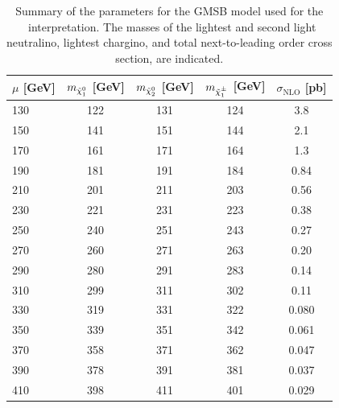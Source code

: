 \begin{table}[htb]
\begin{center}
\footnotesize
\caption{\label{tab:gmsb} Summary of the parameters for the GMSB model used for the \zzmet\ interpretation.
The masses of the lightest and second light neutralino, lightest chargino, and total next-to-leading order
cross section, are indicated.}
\begin{tabular}{l|cccc}
\hline
\hline
$\mu$ [GeV] & $m_{\tilde{\chi}^{0}_{1}}$ [GeV] & $m_{\tilde{\chi}^{0}_{2}}$ [GeV] & $m_{\tilde{\chi}^{\pm}_{1}}$ [GeV] & $\sigma_{\mathrm{NLO}}$ [pb] \\
\hline
130 & 122 & 131 & 124 & 3.8  \\
150 & 141 & 151 & 144 & 2.1  \\
170 & 161 & 171 & 164 & 1.3  \\
190 & 181 & 191 & 184 & 0.84 \\
210 & 201 & 211 & 203 & 0.56 \\
230 & 221 & 231 & 223 & 0.38 \\
250 & 240 & 251 & 243 & 0.27 \\
270 & 260 & 271 & 263 & 0.20 \\
290 & 280 & 291 & 283 & 0.14 \\
310 & 299 & 311 & 302 & 0.11 \\
330 & 319 & 331 & 322 & 0.080 \\
350 & 339 & 351 & 342 & 0.061 \\
370 & 358 & 371 & 362 & 0.047 \\
390 & 378 & 391 & 381 & 0.037 \\
410 & 398 & 411 & 401 & 0.029 \\
\hline
\hline
\end{tabular}
\end{center}
\end{table}
